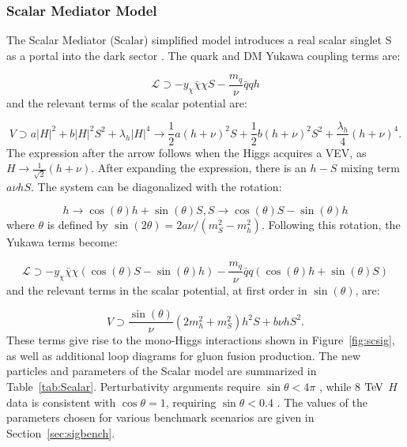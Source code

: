 \subsubsection{Scalar Mediator Model}

The Scalar Mediator (Scalar) simplified model introduces a real scalar singlet S as a portal into the dark sector \cite{MarchRussell:2008yu}. The quark and DM Yukawa coupling terms are:

\begin{equation}
\mathcal{L} \supset -y_\chi \bar{\chi} \chi S - \frac{m_q}{\nu} \bar{q} q h
\end{equation}
and the relevant terms of the scalar potential are:

\begin{equation}
V \supset a |H|^2 + b |H|^2 S^2 + \lambda_h |H|^4 \rightarrow \frac{1}{2} a (h+\nu)^2 S + \frac{1}{2} b (h+\nu)^2 S^2 + \frac{\lambda_h}{4}(h+\nu)^4.
\end{equation}
The expression after the arrow follows when the Higgs acquires a VEV, as $H \rightarrow \frac{1}{\sqrt{2}} (h + \nu)$. After expanding the expression, there is an $h-S$ mixing term $a\nu hS$. The system can be diagonalized with the rotation:

\begin{equation}
h \rightarrow \cos(\theta) h + \sin(\theta) S, S \rightarrow \cos(\theta) S - \sin(\theta) h
\end{equation}
where $\theta$ is defined by $\sin(2\theta) = 2a\nu/(m_S^2-m_h^2)$. Following this rotation, the Yukawa terms become:

\begin{equation}
\mathcal{L} \supset -y_\chi \bar{\chi} \chi (\cos(\theta) S - \sin(\theta) h) - \frac{m_q}{\nu} \bar{q} q (\cos(\theta) h + \sin(\theta) S)
\end{equation}
and the relevant terms in the scalar potential, at first order in $\sin(\theta)$, are:

\begin{equation}
V \supset \frac{\sin(\theta)}{\nu}(2m_h^2 + m_S^2) h^2 S + b \nu h S^2.
\end{equation}
These terms give rise to the mono-Higgs interactions shown in Figure~\ref{fig:scsig}, as well as additional loop diagrams for gluon fusion production. The new particles and parameters of the Scalar model are summarized in Table~\ref{tab:Scalar}. Perturbativity arguments require $\sin\theta<4\pi$ \cite{Carpenter:2013xra}, while 8 $\mathrm{Te\kern -0.1em V}$ $H$ data is consistent with $\cos\theta=1$, requiring $\sin\theta<0.4$ \cite{Falkowski:2013dza, Djouadi:2013qya, Giardino:2013bma, Ellis:2013lra}. The values of the parameters chosen for various benchmark scenarios are given in Section~\ref{sec:sigbench}.

